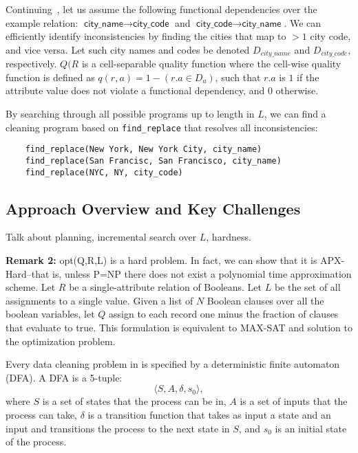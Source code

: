 \begin{example}\label{ex3}
Continuing~, let us assume the following functional dependencies over the example relation: $\textsf{city\_name} \rightarrow \textsf{city\_code}$ and $\textsf{city\_code} \rightarrow \textsf{city\_name}$.
We can efficiently identify inconsistencies by finding the cities that map to $>1$ city code, and vice versa.   Let such city names and codes be denoted $D_{city\_name}$ and $D_{city\_code}$, respectively.
$Q(R$ is a cell-separable quality function where the cell-wise quality function is defined as $q(r, a) = 1 - (r.a \in D_a)$, such that $r.a$ is $1$ if the attribute value does not violate a functional dependency, and $0$ otherwise.

By searching through all possible programs up to length  in $L$, we can find a cleaning program based on \texttt{find\_replace} that resolves all inconsistencies:
\begin{lstlisting}
    find_replace(New York, New York City, city_name)
    find_replace(San Francisc, San Francisco, city_name)
    find_replace(NYC, NY, city_code)
\end{lstlisting}
\end{example}


\subsection{Approach Overview and Key Challenges}
Talk about planning, incremental search over $L$, hardness.

\vspace{0.5em} \noindent \textbf{Remark 2: } \textsf{opt(Q,R,L)} is a hard problem. In fact, we can show that it is APX-Hard--that is, unless P=NP there does not exist a polynomial time approximation scheme.
Let $R$ be a single-attribute relation of Booleans. Let $L$ be the set of all assignments to a single value.
Given a list of $N$ Boolean clauses over all the boolean variables, let $Q$ assign to each record one minus the fraction of clauses that evaluate to true. This formulation is equivalent to MAX-SAT and solution to the optimization problem.




Every data cleaning problem in \sys is specified by a deterministic finite automaton (DFA). 
A DFA is a 5-tuple:
\[\langle S, A, \delta, s_0\rangle,\]
where $S$ is a set of states that the process can be in, $A$ is a set of inputs that the process can take, $\delta$ is a transition function that takes as input a state and an input and transitions the process to the next state in $S$, and $s_0$ is an initial state of the process.


